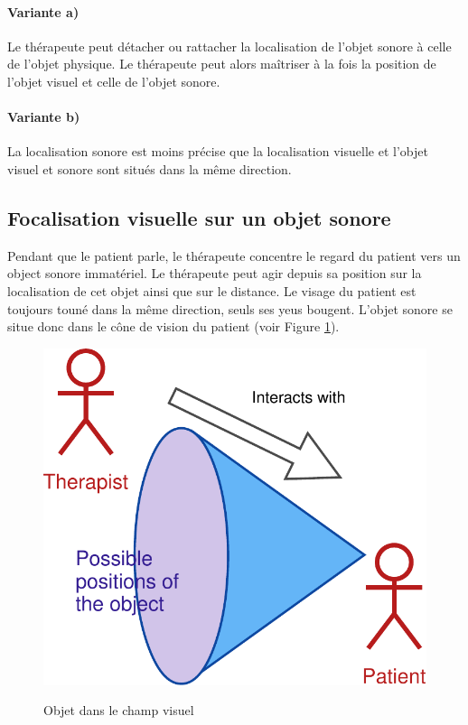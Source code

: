 \documentclass[french]{article}
\begin{document}
\paragraph{Variante a)}
Le thérapeute peut détacher ou rattacher la localisation de l'objet sonore à celle de l'objet physique. Le thérapeute peut alors maîtriser à la fois la position de l'objet visuel et celle de l'objet sonore.
\paragraph{Variante b)}
La localisation sonore est moins précise que la localisation visuelle et l'objet visuel et sonore sont situés dans la même direction.
\subsection{Focalisation visuelle sur un objet sonore}


Pendant que le patient parle, le thérapeute concentre le regard du patient vers un object sonore immatériel. Le thérapeute peut agir depuis sa position sur la localisation de cet objet ainsi que sur le distance. Le visage du patient est toujours touné dans la même direction, seuls ses yeus bougent. L'objet sonore se situe donc dans le cône de vision du patient (voir Figure \ref{conic-situation}).

\begin{figure}[!h]
	\centering
	\includegraphics[scale = 0.6]{schemas/conic-situation.pdf}
	\label{conic-situation}
	\caption{Objet dans le champ visuel}
\end{figure}
\end{document}
